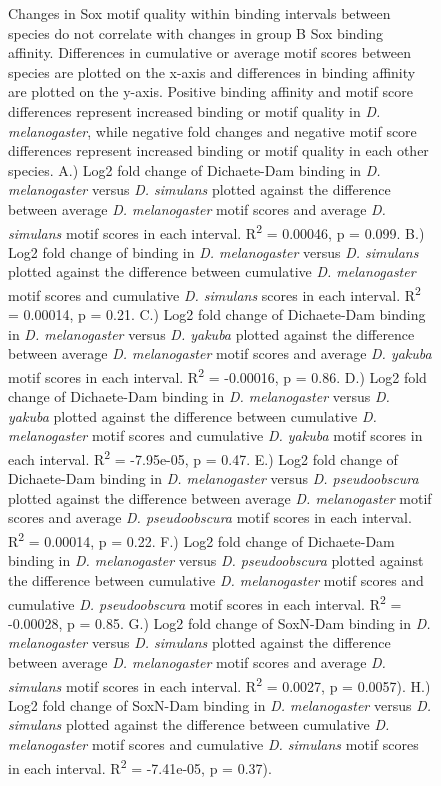 \begin{figure}[H]
\centering
\caption{Changes in Sox motif quality within binding intervals between species do not correlate with changes in group B Sox binding affinity. Differences in cumulative or average motif scores between species are plotted on the x-axis and differences in binding affinity are plotted on the y-axis. Positive binding affinity and motif score differences represent increased binding or motif quality in \emph{D. melanogaster}, while negative fold changes and negative motif score differences represent increased binding or motif quality in each other species. A.) Log2 fold change of Dichaete-Dam binding in \emph{D. melanogaster} versus \emph{D. simulans} plotted against the difference between average \emph{D. melanogaster} motif scores and average \emph{D. simulans} motif scores in each interval. R\textsuperscript{2} = 0.00046, p = 0.099. B.) Log2 fold change of binding in \emph{D. melanogaster} versus \emph{D. simulans} plotted against the difference between cumulative \emph{D. melanogaster} motif scores and cumulative \emph{D. simulans} scores in each interval. R\textsuperscript{2} = 0.00014, p = 0.21. C.) Log2 fold change of Dichaete-Dam binding in \emph{D. melanogaster} versus \emph{D. yakuba} plotted against the difference between average \emph{D. melanogaster} motif scores and average \emph{D. yakuba} motif scores in each interval. R\textsuperscript{2} = -0.00016, p = 0.86. D.) Log2 fold change of Dichaete-Dam binding in \emph{D. melanogaster} versus \emph{D. yakuba} plotted against the difference between cumulative \emph{D. melanogaster} motif scores and cumulative \emph{D. yakuba} motif scores in each interval. R\textsuperscript{2} = -7.95e-05, p = 0.47. E.) Log2 fold change of Dichaete-Dam binding in \emph{D. melanogaster} versus \emph{D. pseudoobscura}  plotted against the difference between average \emph{D. melanogaster} motif scores and average \emph{D. pseudoobscura} motif scores in each interval. R\textsuperscript{2} =  0.00014, p = 0.22.  F.) Log2 fold change of Dichaete-Dam binding in \emph{D. melanogaster} versus \emph{D. pseudoobscura}  plotted against the difference between cumulative \emph{D. melanogaster} motif scores and cumulative \emph{D. pseudoobscura} motif scores in each interval. R\textsuperscript{2} =  -0.00028, p = 0.85. G.) Log2 fold change of SoxN-Dam binding in \emph{D. melanogaster} versus \emph{D. simulans} plotted against the difference between average \emph{D. melanogaster} motif scores and average \emph{D. simulans} motif scores in each interval. R\textsuperscript{2} = 0.0027, p = 0.0057). H.) Log2 fold change of SoxN-Dam binding in \emph{D. melanogaster} versus \emph{D. simulans} plotted against the difference between cumulative \emph{D. melanogaster} motif scores and cumulative \emph{D. simulans} motif scores in each interval. R\textsuperscript{2} =  -7.41e-05, p = 0.37).}
\label{Figure 5.28}
\end{figure}
 

